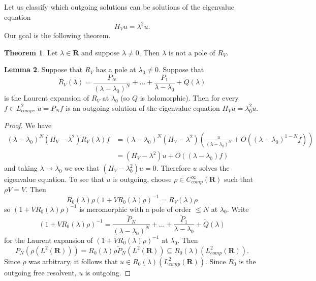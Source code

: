 \documentclass[12pt]{report}
\newcommand{\RR}{\mathbf{R}}
\theoremstyle{definition}
\newtheorem{theorem}{Theorem}[chapter]
\newtheorem{lemma}[theorem]{Lemma}
\begin{document}
Let us classify which outgoing solutions can be solutions of the eigenvalue equation
$$H_Vu = \lambda^2u.$$
Our goal is the following theorem.
\begin{theorem}
\label{real poles are zero}
Let $\lambda \in \RR$ and suppose $\lambda \neq 0$. Then $\lambda$ is not a pole of $R_V$.
\end{theorem}
\begin{lemma}
\label{laurent expansion of the resolvent}
Suppose that $R_V$ has a pole at $\lambda_0 \neq 0$. Suppose that
$$R_V(\lambda) = \frac{P_N}{(\lambda - \lambda_0)^N} + \dots + \frac{P_1}{\lambda - \lambda_0} + Q(\lambda)$$
is the Laurent expansion of $R_V$ at $\lambda_0$ (so $Q$ is holomorphic). Then for every $f \in L^2_{comp}$, $u = P_Nf$ is an outgoing solution of the eigenvalue equation $H_Vu = \lambda_0^2u$.
\end{lemma}
\begin{proof}
We have
\begin{align*}
  (\lambda - \lambda_0)^N(H_V - \lambda^2)R_V(\lambda)f &= (\lambda - \lambda_0)^N (H_V - \lambda^2)\left(\frac{u}{(\lambda - \lambda_0)^N} + O((\lambda - \lambda_0)^{1-N}f)\right)\\
  &= (H_V - \lambda^2)u + O((\lambda - \lambda_0)f)
\end{align*}
and taking $\lambda \to \lambda_0$ we see that $(H_V - \lambda_0^2)u = 0$. Therefore $u$ solves the eigenvalue equation. To see that $u$ is outgoing, choose $\rho \in C^\infty_{comp}(\RR)$ such that $\rho V = V$. Then
$$R_0(\lambda)\rho(1 + VR_0(\lambda)\rho)^{-1} = R_V(\lambda)\rho$$
so $(1 + VR_0(\lambda)\rho)^{-1}$ is meromorphic with a pole of order $\leq N$ at $\lambda_0$. Write
$$(1 + VR_0(\lambda)\rho)^{-1} = \frac{\tilde P_N}{(\lambda - \lambda_0)^N} + \dots + \frac{\tilde P_1}{\lambda - \lambda_0} + \tilde Q(\lambda)$$
for the Laurent expansion of $(1 + VR_0(\lambda)\rho)^{-1}$ at $\lambda_0$. Then
$$P_N(\rho(L^2(\RR))) = R_0(\lambda) \rho \tilde P_N(L^2(\RR)) \subseteq R_0(\lambda)(L^2_{comp}(\RR)).$$
Since $\rho$ was arbitrary, it follows that $u \in R_0(\lambda)(L^2_{comp}(\RR))$. Since $R_0$ is the outgoing free resolvent, $u$ is outgoing.
\end{proof}
\end{document}
